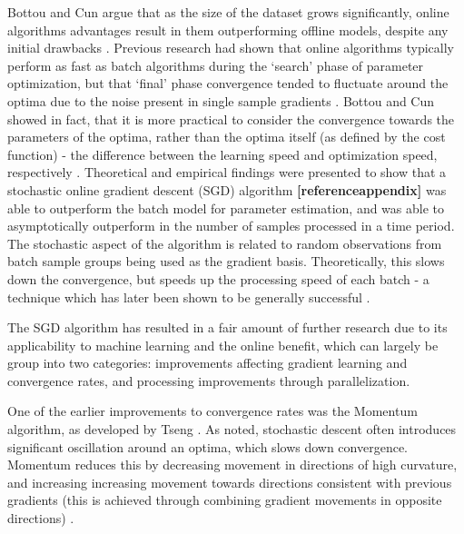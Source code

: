 \documentclass[a4paper,latin]{paper}
\begin{document}
Bottou and Cun argue that as the size of the dataset grows significantly, online algorithms advantages result in 
them outperforming offline models, despite any initial drawbacks \cite{Bottou}. Previous research had shown that online 
algorithms typically perform as fast as batch algorithms during the ‘search’ phase of parameter optimization, but 
that ‘final’ phase convergence tended to fluctuate around the optima due to the noise present in single sample 
gradients \cite{LeCun, Bottou2}. Bottou and Cun showed in fact, that it is more practical to consider the convergence towards
 the parameters of the optima, rather than the optima itself (as defined by the cost function) - the difference 
 between the learning speed and optimization speed, respectively \cite{Bottou}. Theoretical and empirical findings were 
 presented to show that a stochastic online gradient descent (SGD) algorithm \textbf{[referenceappendix] }was able to 
 outperform the batch model for parameter estimation, and was able to asymptotically outperform in the number of 
 samples processed in a time period. The stochastic aspect of the algorithm is related to random observations 
 from batch sample groups being used as the gradient basis. Theoretically, this slows down the convergence, but 
 speeds up the processing speed of each batch - a technique which has later been shown to be generally 
 successful \cite{Shalev, Zhang}. 
 \hfill\break
 
 The SGD algorithm has resulted in a fair amount of further research due to its applicability to machine learning 
 and the online benefit, which can largely be group into two categories: improvements affecting gradient learning 
 and convergence rates, and processing improvements through parallelization.
\hfill\break
 
 One of the earlier improvements to convergence rates was the Momentum algorithm, as developed by Tseng \cite{Tseng}. 
 As noted, stochastic descent often introduces significant oscillation around an optima, which slows down 
 convergence. Momentum reduces this by decreasing movement in directions of high curvature, and increasing 
 increasing movement towards directions consistent with previous gradients (this is achieved through combining 
 gradient movements in opposite directions) .
\hfill\break
\end{document}
